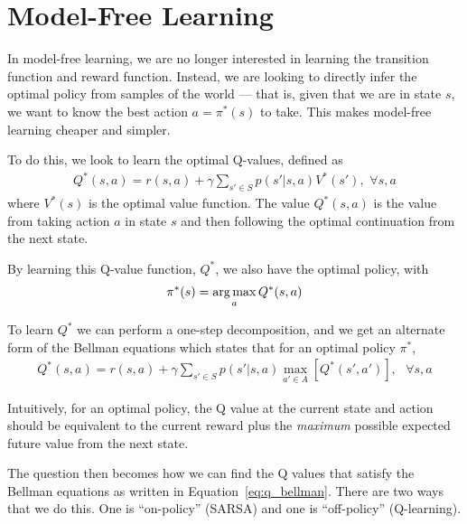 \documentclass[11pt, letterpaper]{article}
\begin{document}
\vspace{.5pc}

\section{Model-Free Learning}

In model-free learning, we are no longer interested in learning the
transition function and reward function. Instead, we are looking to
directly infer the optimal policy from samples of the world --- that
is, given that we are in state $s$, we want to know the best action
$a = \pi^*(s)$ to take. This makes model-free learning cheaper and
simpler.

To do this, we look to learn the optimal Q-values, defined as
%
\begin{align}
  Q^*(s,a)=r(s,a)+\gamma\sum_{s' \in S}p(s' | s, a) V^*(s'), \text{
  } \forall s,a
\end{align}
where $V^*(s)$ is the optimal value function.  The value $Q^*(s,a)$ is
the value from taking action $a$ in state $s$ and then following the
optimal continuation from the next state.

By learning this Q-value function, $Q^*$, we also have the optimal
policy, with
%
\begin{align}
    \pi^*(s) = \argmax_aQ^*(s, a)
\end{align}

To learn $Q^*$ we can perform a one-step decomposition, and we get an
alternate form of the Bellman equations which states that for an
optimal policy $\pi^*$,
%
\begin{align}
    Q^*(s,a) = r(s,a) + \gamma\sum_{s' \in S}p(s' | s, a)\max_{a' \in A}[Q^*(s', a')], \text{  } \forall s,a \label{eq:q_bellman}
\end{align}


Intuitively, for an optimal policy, the Q value at the current state and action should be equivalent to the current reward plus the \emph{maximum} possible expected future value from the next state. 


The question then becomes how we can find the Q values that satisfy the Bellman equations as written in Equation~\ref{eq:q_bellman}. There are two ways that we do this. One is ``on-policy'' (SARSA) and one is ``off-policy'' (Q-learning).

\end{document}
